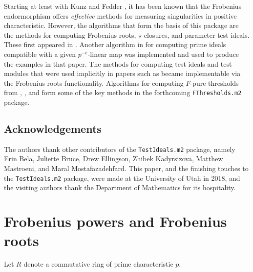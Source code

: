 \documentclass{amsart}
\begin{document}
Starting at least with Kunz \cite{KunzCharacterizationsOfRegularLocalRings} and Fedder \cite{FedderFPureRat}, it has been known that the Frobenius endormorphism offers \emph{effective} methods for measuring singularities in positive characteristic.
However, the algorithms that form the basis of this package are the methods for computing Frobenius roots, $\star$-closures, and parameter test ideals.
These first appeared in \cite{KatzmanParameterTestIdealOfCMRings,BlickleMustataSmithDiscretenessAndRationalityOfFThresholds,BlickleMustataSmithFThresholdsOfHypersurfaces,KatzmanFrobeniusMapsOnInjectiveHulls}.
Another algorithm in \cite{KatzmanSchwedeAlgorithm} for computing prime ideals compatible with a given $p^{-e}$-linear map was implemented and used to produce the examples in that paper.  The methods for computing test ideals and test modules that were used implicitly in papers such as \cite{BlickleSchwedeTakagiZhang,KatzmanLyubeznikZhangOnDiscretenessAndRationality,SchwedeTuckerTestIdealFiniteMaps} became implementable via the Frobenius roots functionality.
Algorithms for computing $F$-pure thresholds from \cite{HernandezFInvariantsOfDiagonalHyp}, \cite{HernandezFPureThresholdOfBinomial}, and \cite{HernandezTeixeiraFThresholdFunctions} form some of the key methods in the forthcoming \texttt{FThresholds.m2} package.

\subsection*{Acknowledgements}
The authors thank other contributors of the \texttt{TestIdeals.m2} package, namely
Erin Bela, Juliette Bruce, Drew Ellingson, Zhibek Kadyrsizova, Matthew Mastroeni, and Maral Mostafazadehfard.
This paper, and the finishing touches to the \texttt{TestIdeals.m2} package, were made at the University of Utah in 2018, and the visiting authors thank the Department of Mathematics for its hospitality.

\section{Frobenius powers and Frobenius roots}\label{Section: Frobenius powers and Frobenius roots}

Let $R$ denote a commutative ring of prime characteristic $p$.
\end{document}
